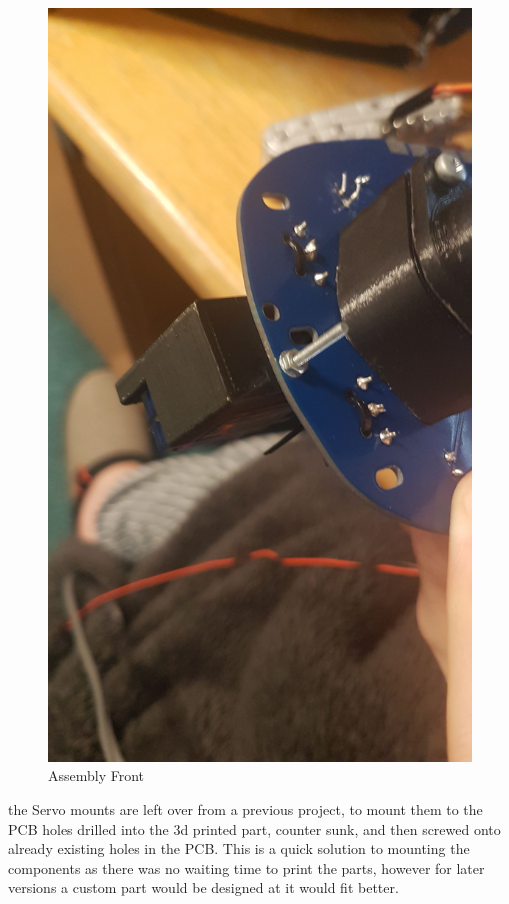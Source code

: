 \begin{figure}[h]
\begin{minipage}{.5\textwidth}
	\includegraphics[width = 1\textwidth]{"assets/servomount_B"}
	\centering
	\caption{Assembly Front}
	\label{fig:servomount_B}
\end{minipage}
\end{figure}

the Servo mounts are left over from a previous project, to mount them to the PCB holes drilled into the 3d printed part, counter sunk, and then screwed onto already existing holes in the PCB. This is a quick solution to mounting the components as there was no waiting time to print the parts, however for later versions a custom part would be designed at it would fit better.   

